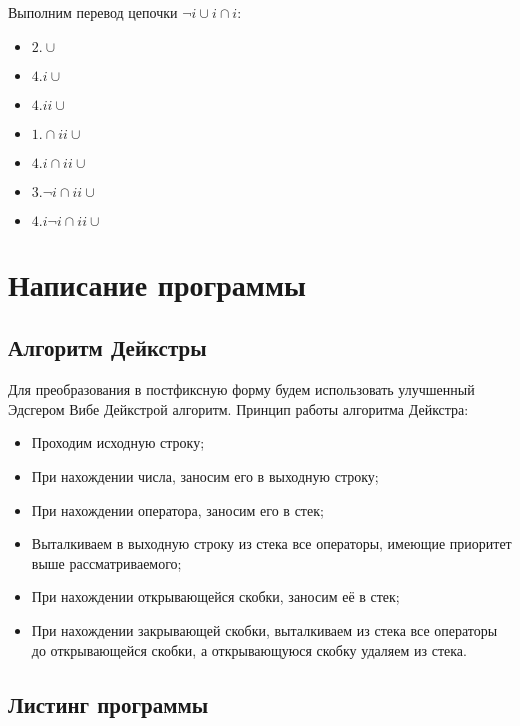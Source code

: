 \documentclass[12pt]{extarticle}
\begin{document}
\begin{sloppypar}
	Выполним перевод цепочки $\neg i \cup i \cap i$:
	
	\begin{itemize}
		\item $2. \cup$
		\item $4. i \cup$
		\item $4. i i \cup$
		\item $1. \cap i i \cup$
		\item $4. i \cap i i \cup$
		\item $3. \neg i \cap i i \cup$
		\item $4. i \neg i \cap i i \cup$
	\end{itemize}
	
	
	\section{Написание программы}
	
	\subsection{Алгоритм Дейкстры}
	
	Для преобразования в постфиксную форму будем использовать улучшенный Эдсгером Вибе Дейкстрой алгоритм. Принцип работы алгоритма Дейкстра:
	
	\begin{itemize}
		
		\item Проходим исходную строку;
		\item При нахождении числа, заносим его в выходную строку;
		\item При нахождении оператора, заносим его в стек;
		\item Выталкиваем в выходную строку из стека все операторы, имеющие приоритет выше рассматриваемого;
		\item При нахождении открывающейся скобки, заносим её в стек;
		\item При нахождении закрывающей скобки, выталкиваем из стека все операторы до открывающейся скобки, а открывающуюся скобку удаляем из стека.
		
	\end{itemize}
	
	\subsection{Листинг программы}
	
 	\scriptsize 
 	

\end{sloppypar}
\end{document}
